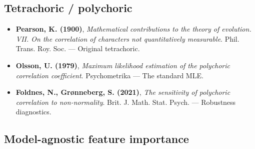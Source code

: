 \documentclass{article}
\providecommand{\tightlist}{\setlength{\itemsep}{0pt}\setlength{\parskip}{0pt}}
\begin{document}
\subsection{Tetrachoric / polychoric}\label{tetrachoric--polychoric}

\begin{itemize}
\tightlist
\item
  \textbf{Pearson, K. (1900)}, \emph{Mathematical contributions to the
  theory of evolution. VII. On the correlation of characters not
  quantitatively measurable}. Phil. Trans. Roy. Soc. --- Original
  tetrachoric.
\item
  \textbf{Olsson, U. (1979)}, \emph{Maximum likelihood estimation of the
  polychoric correlation coefficient}. Psychometrika --- The standard
  MLE.
\item
  \textbf{Foldnes, N., Grønneberg, S. (2021)}, \emph{The sensitivity of
  polychoric correlation to non-normality}. Brit. J. Math. Stat. Psych.
  --- Robustness diagnostics.
\end{itemize}

\subsection{Model-agnostic feature
importance}\label{model-agnostic-feature-importance}
\end{document}
